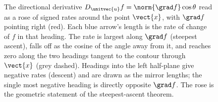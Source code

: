 \begin{figure}[htbp]
\centering
{}
\caption[Directional derivative as a rose of rates.]{The directional
derivative $D_{\unitvec{u}} f = \norm{\grad f}\cos\theta$ read as a rose
of signed rates around the point $\vect{x}$, with $\grad f$ pointing
right (red). Each blue arrow's length is the rate of change of $f$ in
that heading. The rate is largest along $\grad f$ (steepest ascent),
falls off as the cosine of the angle away from it, and reaches zero
along the two headings tangent to the contour through $\vect{x}$ (grey
dashed). Headings into the left half-plane give negative rates (descent)
and are drawn as the mirror lengths; the single most negative heading is
directly opposite $\grad f$. The rose is the geometric statement of the
steepest-ascent theorem.}
\label{fig:vol02:ch11:directional-rose}
\end{figure}
